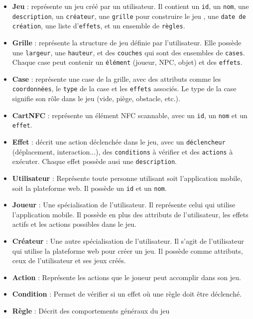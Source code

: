 \documentclass[12pt]{article}        %
\begin{document}
\begin{itemize}
    \item \textbf{Jeu} : représente un jeu créé par un utilisateur. Il 
    contient un \texttt{id}, un \texttt{nom}, une \texttt{description}, 
    un \texttt{créateur}, une \texttt{grille} pour construire le jeu , 
    une \texttt{date de création},  une liste d'\texttt{effets}, et un 
    ensemble de \texttt{règles}.

    \item \textbf{Grille} : représente la structure de jeu définie par 
    l'utilisateur. Elle possède une \texttt{largeur}, une 
    \texttt{hauteur}, et des \texttt{couches} qui sont des ensembles de 
    \texttt{cases}. Chaque case peut contenir un \texttt{élément} 
    (joueur, NPC, objet) et des \texttt{effets}.

    \item \textbf{Case} : représente une case de la grille, avec des 
    attributs comme les \texttt{coordonnées}, le \texttt{type} de
    la case et les \texttt{effets} associés. Le type de la case signifie 
    son rôle dans le jeu (vide, piège, obstacle, etc.).

    \item \textbf{CartNFC} : représente un élément NFC scannable, avec 
    un \texttt{id}, un \texttt{nom} et un \texttt{effet}.
  
    \item \textbf{Effet} : décrit une action déclenchée dans le jeu, 
    avec un \texttt{déclencheur} (déplacement, interaction...), 
    des \texttt{conditions} à vérifier et des \texttt{actions} 
    à exécuter. Chaque effet possède ausi une \texttt{description}.

    \item \textbf{Utilisateur} : Représente toute personne utilisant soit
    l'application mobile, soit la plateforme web. Il possède un 
    \texttt{id} et un \texttt{nom}.
  
    \item \textbf{Joueur} : Une spécialisation de l'utilisateur. Il 
    représente celui qui utilise l'application mobile. Il possède en plus 
    des attributs de l'utilisateur, les effets actifs et les actions
    possibles dans le jeu.

    \item \textbf{Créateur} : Une autre spécialisation de l'utilisateur.
    Il s'agit de l'utilisateur qui utilise la plateforme web pour créer
    un jeu. Il possède comme attributs, ceux de l'utilisateur et ses jeux 
    créés.
  
    \item \textbf{Action} : Représente les actions que le joueur peut 
    accomplir dans son jeu.

    \item \textbf{Condition} : Permet de vérifier si un effet où une 
    règle doit être déclenché.

    \item \textbf{Règle} : Décrit des comportements généraux du jeu
\end{itemize}
\end{document}

